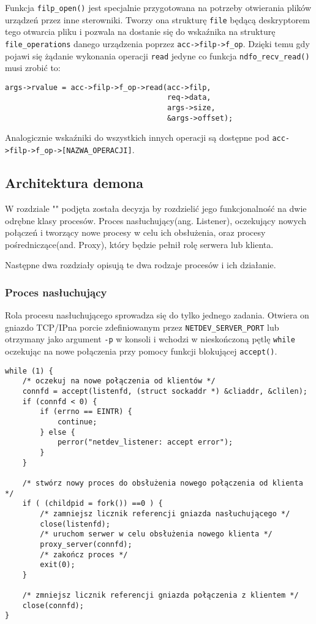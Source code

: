 \documentclass[10pt]{article}
\begin{document}
Funkcja \texttt{filp\_open()} jest specjalnie przygotowana na potrzeby otwierania plików urządzeń przez inne sterowniki. Tworzy ona strukturę \texttt{file} będącą deskryptorem tego otwarcia pliku i pozwala na dostanie się do wskaźnika na strukturę \texttt{file\_operations} danego urządzenia poprzez \texttt{acc-\textgreater{}filp-\textgreater{}f\_op}.  Dzięki temu gdy pojawi się żądanie wykonania operacji \texttt{read} jedyne co funkcja \texttt{ndfo\_recv\_read()} musi zrobić to:

\begin{verbatim}
args->rvalue = acc->filp->f_op->read(acc->filp,
                                     req->data,
                                     args->size,
                                     &args->offset);
\end{verbatim}

Analogicznie wskaźniki do wszystkich innych operacji są dostępne pod \texttt{acc-\textgreater{}filp-\textgreater{}f\_op-\textgreater{}{[}NAZWA\_OPERACJI{]}}.

\subsection{Architektura demona}

W rozdziale "" podjęta została decyzja by rozdzielić jego funkcjonalność na dwie odrębne klasy procesów. Proces nasłuchujący(ang. Listener), oczekujący nowych połączeń i tworzący nowe procesy w celu ich obsłużenia, oraz procesy pośredniczące(and. Proxy), który będzie pełnił rolę serwera lub klienta.

Następne dwa rozdziały opisują te dwa rodzaje procesów i ich działanie.

\subsubsection{Proces nasłuchujący}

Rola procesu nasłuchującego sprowadza się do tylko jednego zadania.  Otwiera on gniazdo TCP/IP\@ na porcie zdefiniowanym przez \texttt{NETDEV\_SERVER\_PORT} lub otrzymany jako argument \texttt{-p} w konsoli i wchodzi w nieskończoną pętlę \texttt{while} oczekując na nowe połączenia przy pomocy funkcji blokującej \texttt{accept()}.

\begin{verbatim}
while (1) {
    /* oczekuj na nowe połączenia od klientów */
    connfd = accept(listenfd, (struct sockaddr *) &cliaddr, &clilen);
    if (connfd < 0) {
        if (errno == EINTR) {
            continue;
        } else {
            perror("netdev_listener: accept error");
        }
    }

    /* stwórz nowy proces do obsłużenia nowego połączenia od klienta */
    if ( (childpid = fork()) ==0 ) {
        /* zamniejsz licznik referencji gniazda nasłuchującego */
        close(listenfd);
        /* uruchom serwer w celu obsłużenia nowego klienta */
        proxy_server(connfd);
        /* zakończ proces */
        exit(0);
    }

    /* zmniejsz licznik referencji gniazda połączenia z klientem */
    close(connfd);
}
\end{verbatim}
\end{document}
